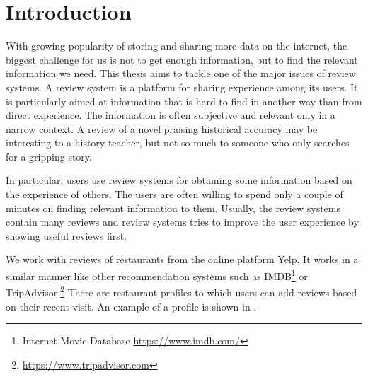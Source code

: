 \chapter*{Introduction}



With growing popularity of storing and sharing more data on the internet, the biggest challenge
for us is not to get enough information, but to find the relevant information we need.
This thesis aims to tackle one of the major issues of review systems.
A review system is a platform for sharing experience among its users.
It is particularly aimed at information that is hard to find in another way than from direct experience.
The information is often subjective and relevant only in a narrow context.
A review of a novel praising historical accuracy may be interesting to a history teacher,
but not so much to someone who only searches for a gripping story.

In particular, users use review systems for obtaining some information based on the experience of others.
The users are often willing to spend only a couple of minutes on finding relevant information to them.
Usually, the review systems contain many reviews and review systems tries to improve the user experience by showing useful reviews first.

We work with reviews of restaurants from the online platform Yelp.
It works in a similar manner like other recommendation systems such as IMDB\footnote{Internet Movie Database \url{https://www.imdb.com/}} or
TripAdvisor.\footnote{\url{https://www.tripadvisor.com}}
There are restaurant profiles to which users can add reviews based on their recent visit.
An example of a profile is shown in .


